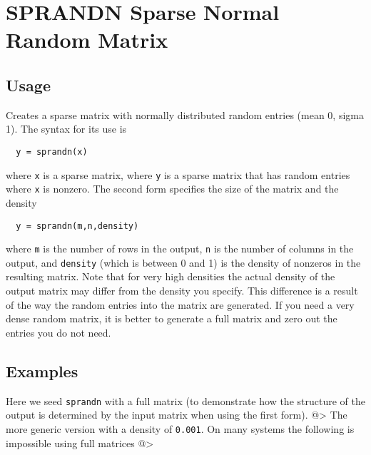 \section{SPRANDN Sparse Normal Random Matrix}

\subsection{Usage}

Creates a sparse matrix with normally distributed random entries (mean 0, sigma 1).  The
syntax for its use is
\begin{verbatim}
  y = sprandn(x)
\end{verbatim}
where \verb|x| is a sparse matrix, where \verb|y| is a sparse matrix that has
random entries where \verb|x| is nonzero.  The second form specifies the
size of the matrix and the density
\begin{verbatim}
  y = sprandn(m,n,density)
\end{verbatim}
where \verb|m| is the number of rows in the output, \verb|n| is the number of 
columns in the output, and \verb|density| (which is between 0 and 1) is
the density of nonzeros in the resulting matrix.  Note that for very
high densities the actual density of the output matrix may differ from
the density you specify.  This difference is a result of the way the
random entries into the matrix are generated.  If you need a very dense
random matrix, it is better to generate a full matrix and zero out the 
entries you do not need.
\subsection{Examples}

Here we seed \verb|sprandn| with a full matrix (to demonstrate how the structure
of the output is determined by the input matrix when using the first form).
@>
The more generic version with a density of \verb|0.001|.  On many systems the
following is impossible using full matrices
@>
